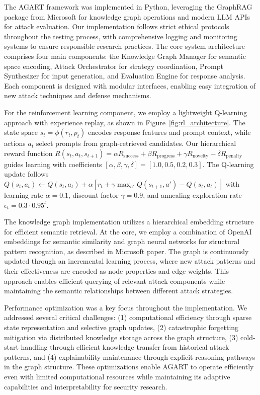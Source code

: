 The AGART framework was implemented in Python, leveraging the GraphRAG package from Microsoft\cite{GraphRAG} for knowledge graph operations and modern LLM APIs for attack evaluation. Our implementation follows strict ethical protocols throughout the testing process, with comprehensive logging and monitoring systems to ensure responsible research practices. The core system architecture comprises four main components: the Knowledge Graph Manager for semantic space encoding, Attack Orchestrator for strategy coordination, Prompt Synthesizer for input generation, and Evaluation Engine for response analysis. Each component is designed with modular interfaces, enabling easy integration of new attack techniques and defense mechanisms.

For the reinforcement learning component, we employ a lightweight Q-learning approach with experience replay, as shown in Figure~\ref{fig:rl_architecture}. The state space $s_t = \phi(r_t, p_t)$ encodes response features and prompt context, while actions $a_t$ select prompts from graph-retrieved candidates. Our hierarchical reward function $R(s_t, a_t, s_{t+1}) = \alpha R_{\text{success}} + \beta R_{\text{progress}} + \gamma R_{\text{novelty}} - \delta R_{\text{penalty}}$ guides learning with coefficients $[\alpha, \beta, \gamma, \delta] = [1.0, 0.5, 0.2, 0.3]$. The Q-learning update follows $Q(s_t, a_t) \leftarrow Q(s_t, a_t) + \alpha[r_t + \gamma \max_{a'} Q(s_{t+1}, a') - Q(s_t, a_t)]$ with learning rate $\alpha = 0.1$, discount factor $\gamma = 0.9$, and annealing exploration rate $\epsilon_t = 0.3 \cdot 0.95^t$.

The knowledge graph implementation utilizes a hierarchical embedding structure for efficient semantic retrieval. At the core, we employ a combination of OpenAI embeddings for semantic similarity and graph neural networks for structural pattern recognition, as described in Microsoft paper. The graph is continuously updated through an incremental learning process, where new attack patterns and their effectiveness are encoded as node properties and edge weights. This approach enables efficient querying of relevant attack components while maintaining the semantic relationships between different attack strategies.

Performance optimization was a key focus throughout the implementation. We addressed several critical challenges: (1) computational efficiency through sparse state representation and selective graph updates, (2) catastrophic forgetting mitigation via distributed knowledge storage across the graph structure, (3) cold-start handling through efficient knowledge transfer from historical attack patterns, and (4) explainability maintenance through explicit reasoning pathways in the graph structure. These optimizations enable AGART to operate efficiently even with limited computational resources while maintaining its adaptive capabilities and interpretability for security research.
